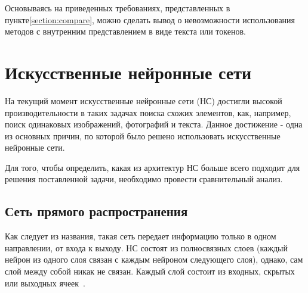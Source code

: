 Основываясь на приведенных требованиях, представленных в пункте\ref{section:compare}, можно сделать вывод о невозможности использования методов с внутренним представлением в виде текста или токенов. 
% 
% 

\section{Искусственные нейронные сети}

На текущий момент искусственные нейронные сети (НС) достигли высокой производительности в таких задачах поиска схожих элементов, как, например, поиск одинаковых изображений, фотографий и текста. Данное достижение - одна из основных причин, по которой было решено использовать искусственные нейронные сети.


Для того, чтобы определить, какая из архитектур НС больше всего подходит для решения поставленной задачи, необходимо провести сравнительный анализ. 

\subsection{Сеть прямого распространения}

Как следует из названия, такая сеть передает информацию только в одном направлении, от входа к выходу. НС состоят из полносвязных слоев (каждый нейрон из одного слоя связан с каждым нейроном следующего слоя), однако, сам слой между собой никак не связан. Каждый слой состоит из входных, скрытых или выходных ячеек~\cite{perceptron}. 

